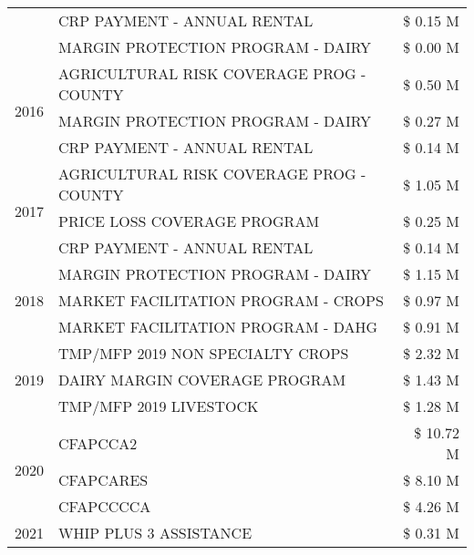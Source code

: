 \begin{tabular}{llr}
 & CRP PAYMENT - ANNUAL RENTAL & \$ 0.15 M \\
 & MARGIN PROTECTION PROGRAM - DAIRY & \$ 0.00 M \\
\cline{1-3}
\multirow[t]{3}{*}{2016} & AGRICULTURAL RISK COVERAGE PROG - COUNTY & \$ 0.50 M \\
 & MARGIN PROTECTION PROGRAM - DAIRY & \$ 0.27 M \\
 & CRP PAYMENT - ANNUAL RENTAL & \$ 0.14 M \\
\cline{1-3}
\multirow[t]{3}{*}{2017} & AGRICULTURAL RISK COVERAGE PROG - COUNTY & \$ 1.05 M \\
 & PRICE LOSS COVERAGE PROGRAM & \$ 0.25 M \\
 & CRP PAYMENT - ANNUAL RENTAL & \$ 0.14 M \\
\cline{1-3}
\multirow[t]{3}{*}{2018} & MARGIN PROTECTION PROGRAM - DAIRY & \$ 1.15 M \\
 & MARKET FACILITATION PROGRAM - CROPS & \$ 0.97 M \\
 & MARKET FACILITATION PROGRAM - DAHG & \$ 0.91 M \\
\cline{1-3}
\multirow[t]{3}{*}{2019} & TMP/MFP 2019 NON SPECIALTY CROPS & \$ 2.32 M \\
 & DAIRY MARGIN COVERAGE PROGRAM & \$ 1.43 M \\
 & TMP/MFP 2019 LIVESTOCK & \$ 1.28 M \\
\cline{1-3}
\multirow[t]{3}{*}{2020} & CFAPCCA2 & \$ 10.72 M \\
 & CFAPCARES & \$ 8.10 M \\
 & CFAPCCCCA & \$ 4.26 M \\
\cline{1-3}
2021 & WHIP PLUS 3 ASSISTANCE & \$ 0.31 M \\
\cline{1-3}
\bottomrule
\end{tabular}
